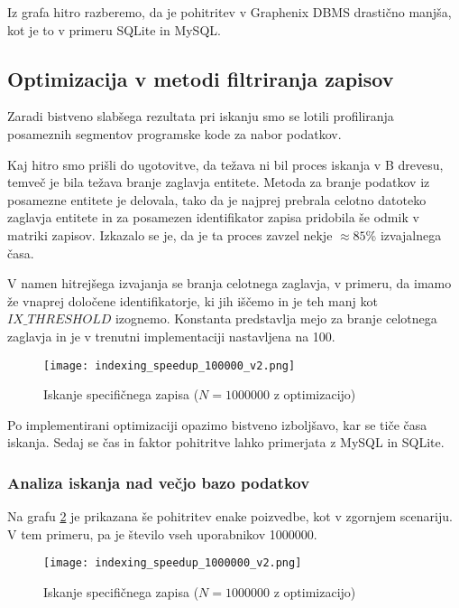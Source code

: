 \documentclass[a4paper,12pt,openright]{book}
\begin{document}
    \noindent
    Iz grafa hitro razberemo, da je pohitritev v Graphenix DBMS drastično manjša, kot je to v primeru SQLite in MySQL.

    \subsection{Optimizacija v metodi filtriranja zapisov}

    Zaradi bistveno slabšega rezultata pri iskanju smo se lotili profiliranja posameznih segmentov programske kode za nabor podatkov.

    Kaj hitro smo prišli do ugotovitve, da težava ni bil proces iskanja v B drevesu, temveč je bila težava branje zaglavja entitete. Metoda za branje podatkov iz posamezne entitete je delovala, tako da je najprej prebrala celotno datoteko zaglavja entitete in za posamezen identifikator zapisa pridobila še odmik v matriki zapisov. Izkazalo se je, da je ta proces zavzel nekje $\approx 85$\% izvajalnega časa.

    V namen hitrejšega izvajanja se branja celotnega zaglavja, v primeru, da imamo že vnaprej določene identifikatorje, ki jih iščemo in je teh manj kot $IX\_THRESHOLD$ izognemo. Konstanta predstavlja mejo za branje celotnega zaglavja in je v trenutni implementaciji nastavljena na \num{100}.
    
    \begin{figure}[H]
        \centerline{\texttt{[image: indexing\_speedup\_100000\_v2.png]}}
        \caption{Iskanje specifičnega zapisa ($N = \num{1000000}$ z optimizacijo)}
        \label{idx_speedup}
    \end{figure}

    \noindent
    Po implementirani optimizaciji opazimo bistveno izboljšavo, kar se tiče časa iskanja. Sedaj se čas in faktor pohitritve lahko primerjata z MySQL in SQLite.

    \subsubsection{Analiza iskanja nad večjo bazo podatkov}

    Na grafu \ref{idx_speedup_2} je prikazana še pohitritev enake poizvedbe, kot v zgornjem scenariju. V tem primeru, pa je število vseh uporabnikov \num{1000000}.
    
    \begin{figure}[H]
        \centerline{\texttt{[image: indexing\_speedup\_1000000\_v2.png]}}
        \caption{Iskanje specifičnega zapisa ($N = \num{1000000}$ z optimizacijo)}
        \label{idx_speedup_2}
    \end{figure}
\end{document}
